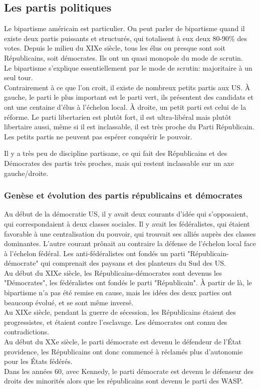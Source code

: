 \documentclass[10pt, a4paper, openany]{book}
\begin{document}
\subsection{Les partis politiques}

Le bipartisme américain est particulier. On peut parler de bipartisme quand il existe deux partis puissants et structurés, qui totalisent à eux deux 80-90\% des votes. Depuis le milieu du XIXe siècle, tous les élus ou presque sont soit Républicains, soit démocrates. Ils ont un quasi monopole du mode de scrutin. \\
Le bipartisme s'explique essentiellement par le mode de scrutin: majoritaire à un seul tour. \\
Contrairement à ce que l'on croit, il existe de nombreux petits partis aux US. À gauche, le parti le plus important est le parti vert, ils présentent des candidats et ont une centaine d'élus à l'échelon local. À droite, un petit parti est celui de la réforme. Le parti libertarien est plutôt fort, il est ultra-libéral mais plutôt libertaire aussi, même si il est inclassable, il est très proche du Parti Républicain.  \\
Les petits partis ne peuvent pas espérer conquérir le pouvoir. 


Il y a très peu de discipline partisane, ce qui fait des Républicains et des Démocrates des partis très proches, mais qui restent inclassable sur un axe gauche/droite.

\subsubsection{Genèse et évolution des partis républicains et démocrates}

Au début de la démocratie US, il y avait deux courants d'idée qui s'opposaient, qui correspondaient à deux classes sociales. Il y avait les fédéralistes, qui étaient favorable à une centralisation du pouvoir, qui trouvait ses alliés auprès des classes dominantes. L'autre courant prônait au contraire la défense de l'échelon local face à l'échelon fédéral. Les anti-fédéralistes ont fondés un parti "Républicain-démocrate" qui comprenait des paysans et des planteurs du Sud des US. \\
Au début du XIXe siècle, les Républicains-démocrates sont devenus les "Démocrates", les fédéralistes ont fondés le parti "Républicain". À partir de là, le bipartisme n'a pas été remise en cause, mais les idées des deux parties ont beaucoup évolué, et se sont même inversé. \\
Au XIXe siècle, pendant la guerre de sécession, les Républicains étaient des progressistes, et étaient contre l'esclavage. Les démocrates ont connu des contradictions. \\
Au début du XXe siècle, le parti démocrate est devenu le défendeur de l'État providence, les Républicains ont donc commencé à réclamés plus d'autonomie pour les États fédérés. \\
Dans les années 60, avec Kennedy, le parti démocrate est devenu le défenseur des droits des minorités alors que les républicains sont devenu le parti des WASP. 
\end{document}
